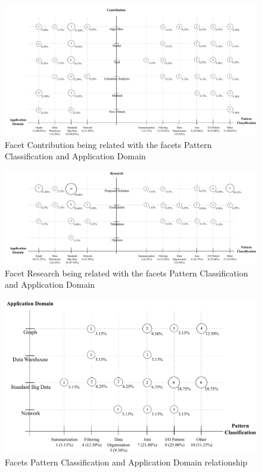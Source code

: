 \begin{figure}[hbtp]
\centering
\includegraphics[scale=0.47]{figs/Contribution-Patterns-Domain.pdf}
\caption{Facet Contribution being related with the facets Pattern
Classification and Application Domain}
\label{fig:contribution-patterns-domain}
\end{figure}

\begin{figure}[hbtp]
\centering
\includegraphics[scale=0.47]{figs/Research-Patterns-Domain.pdf}
\caption{Facet Research being related with the facets Pattern
Classification and Application Domain}
\label{fig:research-patterns-domain}
\end{figure}

\begin{figure}[hbtp]
\centering
\includegraphics[scale=0.7]{figs/Patterns-Domain.pdf}
\caption{Facets Pattern
Classification and Application Domain relationship}
\label{fig:patterns-domain}
\end{figure}


